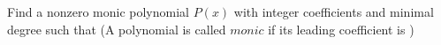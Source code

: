 Find a nonzero monic polynomial $P(x)$ with integer coefficients and minimal degree such that   (A polynomial is called $\textit{monic}$ if its leading coefficient is )